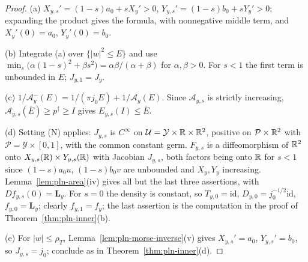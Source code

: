 \begin{proof}
(a) $X_{y,s}'=(1-s)a_0+sX_y'>0$, $Y_{y,s}'=(1-s)b_0+sY_y'>0$; expanding the product gives the formula, with nonnegative middle term, and $X_y'(0)=a_0$, $Y_y'(0)=b_0$.

(b) Integrate (a) over $\{|w|^2\le E\}$ and use $\min_s\bigl(\alpha(1-s)^2+\beta s^2\bigr)=\alpha\beta/(\alpha+\beta)$ for $\alpha,\beta>0$. For $s<1$ the first term is unbounded in $E$; $J_{y,1}=J_y$.

(c) $1/\mathcal A^-_y(E)=1/(\pi j_0E)+1/\mathcal A_y(E)$. Since $\mathcal A_{y,s}$ is strictly increasing, $\mathcal A_{y,s}(\bar E)\ge p^\dagger\ge I$ gives $E_{y,s}(I)\le\bar E$.

(d) Setting (N) applies: $J_{y,s}$ is $C^\infty$ on $\mathcal U=\mathcal Y\times\mathbb{R}\times\mathbb{R}^2$, positive on $\mathcal P\times\mathbb{R}^2$ with $\mathcal P=\mathcal Y\times[0,1]$, with the common constant germ. $F_{y,s}$ is a diffeomorphism of $\mathbb{R}^2$ onto $X_{y,s}(\mathbb{R})\times Y_{y,s}(\mathbb{R})$ with Jacobian $J_{y,s}$, both factors being onto $\mathbb{R}$ for $s<1$ since $(1-s)a_0u$, $(1-s)b_0v$ are unbounded and $X_y,Y_y$ increasing. Lemma~\ref{lem:pln-area}(iv) gives all but the last three assertions, with $Df_{y,s}(0)=\mathbf L_y$. For $s=0$ the density is constant, so $T_{y,0}=\mathrm{id}$, $D_{y,0}=j_0^{-1/2}\mathrm{id}$, $f_{y,0}=\mathbf L_y$; clearly $f_{y,1}=f_y$; the last assertion is the computation in the proof of Theorem~\ref{thm:pln-inner}(b).

(e) For $|w|\le\rho_T$, Lemma~\ref{lem:pln-morse-inverse}(v) gives $X_{y,s}'=a_0$, $Y_{y,s}'=b_0$, so $J_{y,s}=j_0$; conclude as in Theorem~\ref{thm:pln-inner}(d).
\end{proof}

